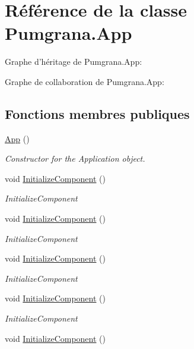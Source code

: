 \hypertarget{class_pumgrana_1_1_app}{\section{Référence de la classe Pumgrana.\+App}
\label{class_pumgrana_1_1_app}
}


Graphe d'héritage de Pumgrana.\+App\+:


Graphe de collaboration de Pumgrana.\+App\+:
\subsection*{Fonctions membres publiques}
\begin{DoxyCompactItemize}
\item 
\hyperlink{class_pumgrana_1_1_app_a76c3c1a346285ac9cb61a56b06333444}{App} ()
\begin{DoxyCompactList}\small\item\em Constructor for the Application object. \end{DoxyCompactList}\item 
void \hyperlink{class_pumgrana_1_1_app_a87aa7434a1b6fd29f27bd89a0f79a50d}{Initialize\+Component} ()
\begin{DoxyCompactList}\small\item\em Initialize\+Component \end{DoxyCompactList}\item 
void \hyperlink{class_pumgrana_1_1_app_a87aa7434a1b6fd29f27bd89a0f79a50d}{Initialize\+Component} ()
\begin{DoxyCompactList}\small\item\em Initialize\+Component \end{DoxyCompactList}\item 
void \hyperlink{class_pumgrana_1_1_app_a87aa7434a1b6fd29f27bd89a0f79a50d}{Initialize\+Component} ()
\begin{DoxyCompactList}\small\item\em Initialize\+Component \end{DoxyCompactList}\item 
void \hyperlink{class_pumgrana_1_1_app_a87aa7434a1b6fd29f27bd89a0f79a50d}{Initialize\+Component} ()
\begin{DoxyCompactList}\small\item\em Initialize\+Component \end{DoxyCompactList}\item 
void \hyperlink{class_pumgrana_1_1_app_a87aa7434a1b6fd29f27bd89a0f79a50d}{Initialize\+Component} ()

\end{DoxyCompactItemize}
